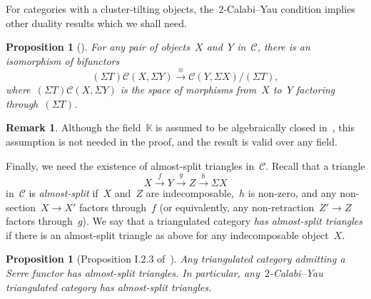 \documentclass{amsart}
\newtheorem{proposition}[theorem]{Proposition}
\theoremstyle{definition}
\newtheorem{remark}[theorem]{Remark}
\newcommand{\darkblue}{\color{darkblue}} %
\newcommand{\defn}[1]{\textsl{\darkblue #1}} %
\newcommand{\field}{\mathbb{K}}
\newcommand{\cat}{\mathcal{C}}
\newcommand{\susp}{\Sigma}
\begin{document}
For categories with a cluster-tilting objects, the~$2$-Calabi--Yau condition implies other duality results which we shall need.

\begin{proposition}[\cite{Palu}]
 For any pair of objects~$X$ and~$Y$ in~$\cat$, there is an isomorphism of bifunctors
 \[
  (\susp T)\cat(X, \susp Y) \xrightarrow{\cong} \cat(Y, \susp X)/(\susp T),
 \]
 where~$(\susp T)\cat(X, \susp Y)$ is the space of morphisms from~$X$ to~$Y$ factoring through~$(\susp T)$.
\end{proposition}

\begin{remark}
 Although the field~$\field$ is assumed to be algebraically closed in~\cite{Palu}, this assumption is not needed in the proof, and the result is valid over any field.
\end{remark}

Finally, we need the existence of almost-split triangles in~$\cat$.  Recall that a triangle
\[
 X\xrightarrow{f} Y \xrightarrow{g} Z \xrightarrow{h} \susp X
\]
in~$\cat$ is \defn{almost-split} if~$X$ and~$Z$ are indecomposable,~$h$ is non-zero, and any non-section~$X\to X'$ factors through~$f$  (or equivalently, any non-retraction~$Z'\to Z$ factors through~$g$).  We say that a triangulated category \defn{has almost-split triangles} if there is an almost-split triangle as above for any indecomposable object~$X$. 

\begin{proposition}[Proposition I.2.3 of~\cite{ReitenVandenbergh}]
 Any triangulated category admitting a Serre functor has almost-split triangles.  In particular, any~$2$-Calabi--Yau triangulated category has almost-split triangles.
\end{proposition}
\end{document}

